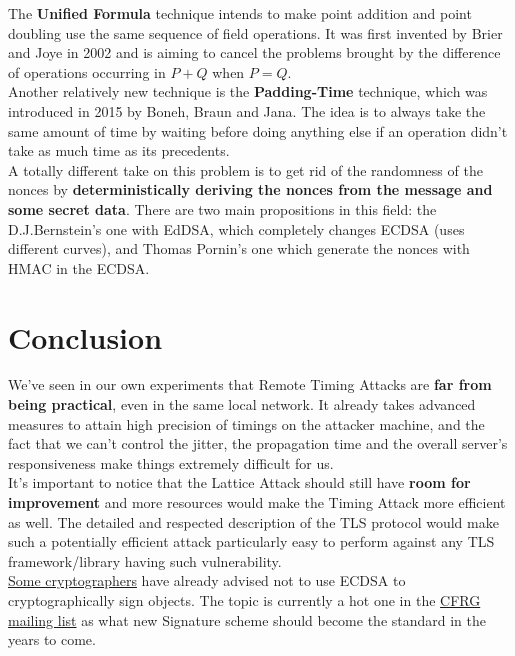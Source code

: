 \documentclass[a4paper,11pt]{article}
\begin{document}
The \textbf{Unified Formula} technique intends to make point addition and point doubling use the same sequence of field operations. It was first invented by Brier and Joye in 2002\cite{unified} and is aiming to cancel the problems brought by the difference of operations occurring in $P + Q$ when $P = Q$.\\

Another relatively new technique is the \textbf{Padding-Time} technique, which was introduced in 2015 by Boneh, Braun and Jana. The idea is to always take the same amount of time by waiting before doing anything else if an operation didn't take as much time as its precedents.\\

A totally different take on this problem is to get rid of the randomness of the nonces by \textbf{deterministically deriving the nonces from the message and some secret data}. There are two main propositions in this field: the D.J.Bernstein's one with EdDSA\cite{eddsa}, which completely changes ECDSA (uses different curves), and Thomas Pornin's\cite{pornin} one which generate the nonces with HMAC in the ECDSA.

\section{Conclusion}

We've seen in our own experiments that Remote Timing Attacks are \textbf{far from being practical}, even in the same local network. It already takes advanced measures to attain high precision of timings on the attacker machine, and the fact that we can't control the jitter, the propagation time and the overall server's responsiveness make things extremely difficult for us.\\

It's important to notice that the Lattice Attack should still have \textbf{room for improvement} and more resources would make the Timing Attack more efficient as well. The detailed and respected description of the TLS protocol would make such a potentially efficient attack particularly easy to perform against any TLS framework/library having such vulnerability.\\ \href{http://blog.cryptographyengineering.com/2012/03/surviving-bad-rng.html}{Some cryptographers} have already advised not to use ECDSA to cryptographically sign objects. The topic is currently a hot one in the \href{http://www.ietf.org/mail-archive/web/cfrg/current/maillist.html}{CFRG mailing list} as what new Signature scheme should become the standard in the years to come.
\end{document}
